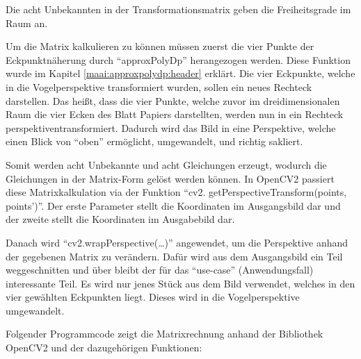 Die acht Unbekannten in der Transformationsmatrix geben die Freiheitsgrade im Raum an.

Um die Matrix kalkulieren zu können müssen zuerst die vier Punkte der Eckpunktnäherung durch ``approxPolyDp'' herangezogen werden. Diese Funktion wurde im Kapitel \ref{maai:approxpolydp:header} erklärt. Die vier Eckpunkte, welche in die Vogelperspektive transformiert wurden, sollen ein neues Rechteck darstellen. Das heißt, dass die vier Punkte, welche zuvor im dreidimensionalen Raum die vier Ecken des Blatt Papiers darstellten, werden nun in ein Rechteck perspektiventransformiert. Dadurch wird das Bild in eine Perspektive, welche einen Blick von ``oben'' ermöglicht, umgewandelt, und richtig sakliert.

Somit werden acht Unbekannte und acht Gleichungen erzeugt, wodurch die Gleichungen in der Matrix-Form gelöst werden können. In OpenCV2 passiert diese Matrixkalkulation via der Funktion ``cv2. getPerspectiveTransform(points, points')''. Der erste Parameter stellt die Koordinaten im Ausgangsbild dar und der zweite stellt die Koordinaten im Ausgabebild dar.

Danach wird ``cv2.wrapPerspective(\dots)'' angewendet, um die Perspektive anhand der gegebenen Matrix zu verändern. Dafür wird aus dem Ausgangsbild ein Teil weggeschnitten und über bleibt der für das ``use-case'' (Anwendungsfall) interessante Teil. Es wird nur jenes Stück aus dem Bild verwendet, welches in den vier gewählten Eckpunkten liegt. Dieses wird in die Vogelperspektive umgewandelt.

Folgender Programmcode zeigt die Matrixrechnung anhand der Bibliothek OpenCV2 und der dazugehörigen Funktionen:



